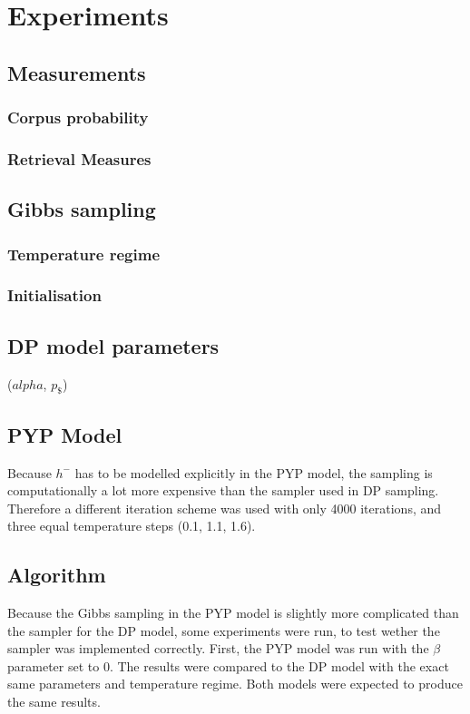 \section{Experiments}

\subsection{Measurements}
\subsubsection{Corpus probability}
\subsubsection{Retrieval Measures}

\subsection{Gibbs sampling}

\subsubsection{Temperature regime}

\subsubsection{Initialisation}

\subsection{DP model parameters}
 ($alpha$, $p_\$$)

\subsection{PYP Model}

Because $h^{-}$ has to be modelled explicitly in the PYP model, the sampling is computationally a lot more expensive than the sampler used in DP sampling. Therefore a different iteration scheme was used with only 4000 iterations, and three equal temperature steps (0.1, 1.1, 1.6).

\subsection{Algorithm}
Because the Gibbs sampling in the PYP model is slightly more complicated than the sampler for the DP model, some experiments were run, to test wether the sampler was implemented correctly. 
First, the PYP model was run with the $\beta$ parameter set to 0. The results were compared to the DP model with the exact same parameters and temperature regime. Both models were expected to produce the same results.

